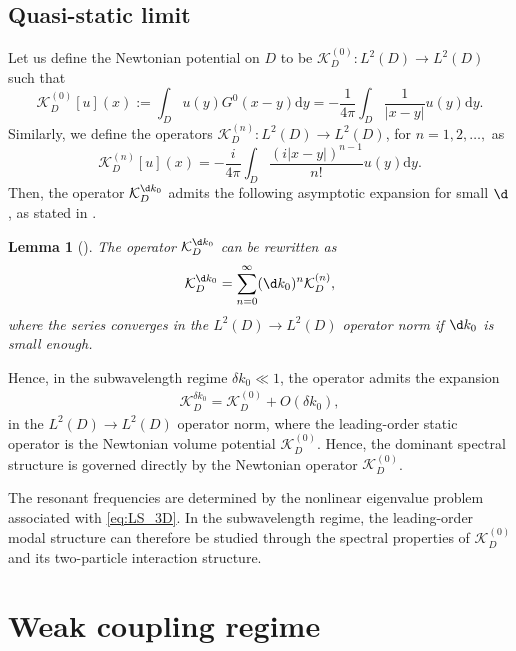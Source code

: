 \documentclass[10pt]{article}
\numberwithin{equation}{section}
\newtheorem{lemma}[theorem]{Lemma}
\newcommand{\upd}{\mathrm{d}}
\begin{document}
\subsection{Quasi-static limit}


Let us define the Newtonian potential on $D$ to be $\mathcal{K}^{(0)}_D: L^2(D)\to L^2(D)$ such that
\begin{equation}\label{eq:K_3D_static}
    \mathcal{K}^{(0)}_D[u](x) := \int_D u(y) G^0(x-y) \upd y = - \frac{1}{4\pi} \int_D \frac{1}{|x-y|}u(y)\upd y.
\end{equation}
Similarly, we define the operators $\mathcal{K}^{(n)}_D: L^2(D) \to L^2(D)$, for $n=1,2,\dots,$ as
\begin{equation}\label{Kn}
    \mathcal{K}^{(n)}_D[u](x) = - \frac{i}{4\pi} \int_D \frac{(i|x-y|)^{n-1}}{n!}u(y)\upd y.
\end{equation}
Then, the operator $\mathcal{K}^{\d k_0}_D$ admits the following asymptotic expansion for small $\d$, as stated in \cite{AD}.
\begin{lemma}[\cite{AD}] \label{Taylor d=3}
    The operator $\mathcal{K}^{\d k_0}_D$ can be rewritten as
    \begin{align*}
        \mathcal{K}^{\d k_0}_D = \sum_{n=0}^{\infty} (\d k_0)^n \mathcal{K}^{(n)}_D,
    \end{align*}
    where the series converges in the $L^2(D) \to L^2(D)$ operator norm if $\d k_0$ is small enough.
\end{lemma}

Hence, in the subwavelength regime $\delta k_0\ll1$, the operator admits the expansion
\begin{align}\label{eq:K_3D_expansion}
    \mathcal K_D^{\delta k_0} = \mathcal K_D^{(0)} + O(\delta k_0),
\end{align}
in the $L^2(D)\to L^2(D)$ operator norm, where the leading-order static operator is the Newtonian volume potential $\mathcal K_D^{(0)}$. Hence, the dominant spectral structure is governed directly by the Newtonian operator $\mathcal K_D^{(0)}$.

The resonant frequencies are determined by the nonlinear eigenvalue problem associated with \eqref{eq:LS_3D}. In the subwavelength regime, the leading-order modal structure can therefore be studied through the spectral properties of $\mathcal K_D^{(0)}$ and its two-particle interaction structure.





\section{Weak coupling regime} \label{sec:weak coupling}
\end{document}
